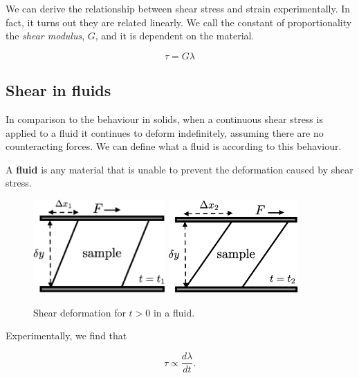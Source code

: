 We can derive the relationship between shear stress and strain experimentally. In fact, it turns out they are related linearly. We call the constant of proportionality the \textit{shear modulus}, $G$, and it is dependent on the material.

\begin{equation}\label{eq:shear-in-solids}
  \tau = G \lambda
\end{equation}


\subsection{Shear in fluids}

In comparison to the behaviour in solids, when a continuous shear stress is applied to a fluid it continues to deform indefinitely, assuming there are no counteracting forces. We can define what a fluid is according to this behaviour.

\begin{definition}
  A \textbf{fluid} is any material that is unable to prevent the deformation caused by shear stress.
\end{definition}

\begin{figure}[h] \label{fig:shear-fluid}
  \centering
  \includegraphics[width=5.05cm]{fig/shear-fluid-t1.png}
  \includegraphics[width=4.95cm]{fig/shear-fluid-t2.png}
  \caption{Shear deformation for $t>0$ in a fluid.}
\end{figure}

Experimentally, we find that

\begin{equation}
  \tau \propto \frac{ d \lambda }{ d t }.
\end{equation}

